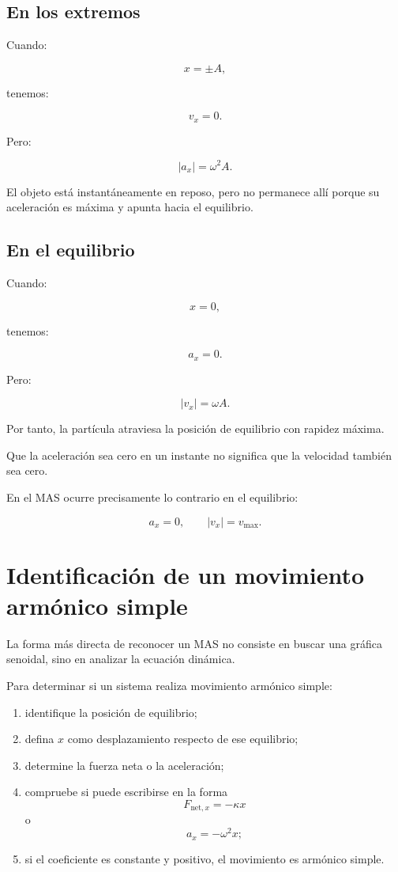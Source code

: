 \subsection{En los extremos}

Cuando:

\[ x=\pm A, \]

tenemos:

\[ v_x=0. \]

Pero:

\[ |a_x|=\omega^2A. \]

El objeto está instantáneamente en reposo, pero no permanece allí porque su aceleración es máxima y apunta hacia el equilibrio.

\subsection{En el equilibrio}

Cuando:

\[ x=0, \]

tenemos:

\[ a_x=0. \]

Pero:

\[ |v_x|=\omega A. \]

Por tanto, la partícula atraviesa la posición de equilibrio con rapidez máxima.

\begin{errorfrecuente}
Que la aceleración sea cero en un instante no significa que la velocidad también sea cero.

En el MAS ocurre precisamente lo contrario en el equilibrio:

\[ a_x=0,\qquad |v_x|=v_{\max}. \]
\end{errorfrecuente}

\section{Identificación de un movimiento armónico simple}

La forma más directa de reconocer un MAS no consiste en buscar una gráfica senoidal, sino en analizar la ecuación dinámica.

\begin{estrategia}
Para determinar si un sistema realiza movimiento armónico simple:

\begin{enumerate}
    \item identifique la posición de equilibrio;
    \item defina \(x\) como desplazamiento respecto de ese equilibrio;
    \item determine la fuerza neta o la aceleración;
    \item compruebe si puede escribirse en la forma
    \[ F_{\text{net},x}=-\kappa x \]
    o
    \[ a_x=-\omega^2x; \]
    \item si el coeficiente es constante y positivo, el movimiento es armónico simple.
\end{enumerate}
\end{estrategia}


